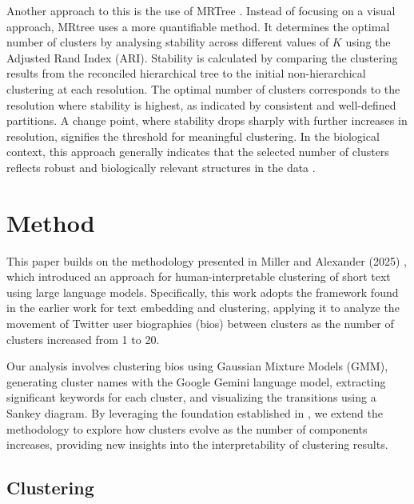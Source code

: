 \documentclass{article}
\begin{document}
Another approach to this is the use of MRTree \cite{pengCellTypeHierarchy2021}. Instead of focusing on a visual approach, MRtree uses a more quantifiable method. It determines the optimal number of clusters by analysing stability across different values of $K$ using the Adjusted Rand Index (ARI). Stability is calculated by comparing the clustering results from the reconciled hierarchical tree to the initial non-hierarchical clustering at each resolution. The optimal number of clusters corresponds to the resolution where stability is highest, as indicated by consistent and well-defined partitions.  A change point, where stability drops sharply with further increases in resolution, signifies the threshold for meaningful clustering. In the biological context, this approach generally indicates that the selected number of clusters reflects robust and biologically relevant structures in the data \cite{handlComputationalClusterValidation2005, ronanAvoidingCommonPitfalls2016}. %







\section{Method}

This paper builds on the methodology presented in Miller and Alexander (2025) \cite{Miller2025}, which introduced an approach for human-interpretable clustering of short text using large language models. Specifically, this work adopts the framework found in the earlier work for text embedding and clustering, applying it to analyze the movement of Twitter user biographies (bios) between clusters as the number of clusters increased from 1 to 20.

Our analysis involves clustering bios using Gaussian Mixture Models (GMM), generating cluster names with the Google Gemini language model, extracting significant keywords for each cluster, and visualizing the transitions using a Sankey diagram. By leveraging the foundation established in \cite{Miller2025}, we extend the methodology to explore how clusters evolve as the number of components increases, providing new insights into the interpretability of clustering results.

\subsection*{Clustering}
\end{document}
